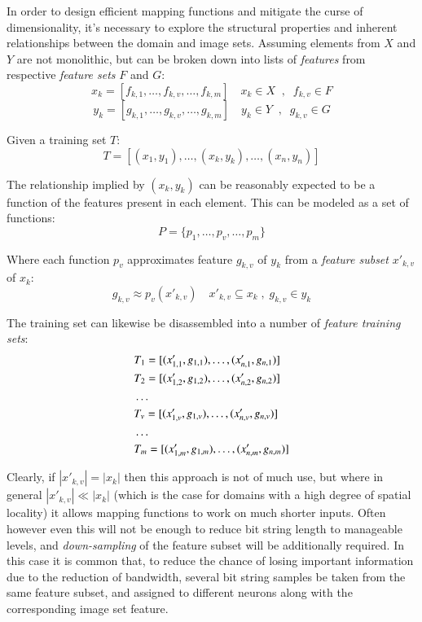 \documentclass[twocolumn, 9pt]{jsproceedings}
\begin{document}
In order to design efficient mapping functions and mitigate the curse of dimensionality, it's necessary to explore the structural properties and inherent relationships between the domain and image sets. Assuming elements from \(X\) and \(Y\) are not monolithic, but can be broken down into lists of {\it features} from respective {\it feature sets} \(F\) and \(G\):
\begin{equation}
x_k = [ f_{k,1} , \dotsc , f_{k,v} , \dotsc , f_{k,m} ] \quad x_k \in X \;\; , \;\; f_{k,v} \in F
\end{equation}
\begin{equation}
y_k = [ g_{k,1} , \dotsc , g_{k,v} , \dotsc , g_{k,m} ] \quad y_k \in Y \;\; , \;\; g_{k,v} \in G
\end{equation}

Given a training set \(T\):
\begin{equation}
T = [ (x_1 , y_1), \dotsc, (x_k , y_k), \dotsc, (x_n , y_n) ]
\end{equation}

The relationship implied by \((x_k , y_k)\) can be reasonably expected to be a function of the features present in each element. This can be modeled as a set of functions:
\begin{equation}
P = \{ p_1 , \dotsc , p_v , \dotsc , p_m \}
\end{equation}

Where each function \(p_v\) approximates feature \(g_{k,v}\) of \(y_k\) from a {\it feature subset} \(x'_{k,v}\) of \(x_k\):
\begin{equation}
g_{k,v} \approx p_v(x'_{k,v}) \quad x'_{k,v} \subseteq x_k \; , \; g_{k,v} \in y_k
\end{equation}

The training set can likewise be disassembled into a number of {\it feature training sets}:
\begin{align}
& T_1 = [ (x'_{1,1} , g_{1,1}), \dotsc, (x'_{n,1} , g_{n,1}) ] \\
& T_2 = [ (x'_{1,2} , g_{1,2}), \dotsc, (x'_{n,2} , g_{n,2}) ] \notag\\
& \dots \notag\\
& T_v = [ (x'_{1,v} , g_{1,v}), \dotsc, (x'_{n,v} , g_{n,v}) ] \notag\\
& \dots \notag\\
& T_m = [ (x'_{1,m} , g_{1,m}), \dotsc, (x'_{n,m} , g_{n,m}) ] \notag
\end{align}

Clearly, if \(|x'_{k,v}| = |x_k|\) then this approach is not of much use, but where in general \(|x'_{k,v}| \ll |x_k|\) (which is the case for domains with a high degree of spatial locality) it allows mapping functions to work on much shorter inputs. Often however even this will not be enough to reduce bit string length to manageable levels, and {\it down-sampling} of the feature subset will be additionally required. In this case it is common that, to reduce the chance of losing important information due to the reduction of bandwidth, several bit string samples be taken from the same feature subset, and assigned to different neurons along with the corresponding image set feature.
\end{document}

